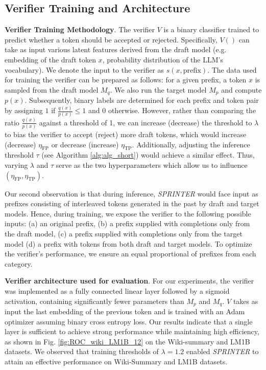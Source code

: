 \documentclass{article}
\newcommand{\revision}[1]{{\color{black} #1}}
\theoremstyle{plain}
\theoremstyle{definition}
\theoremstyle{remark}
\begin{document}
\subsection{Verifier Training and Architecture}
\label{sec:learn_veri}
\textbf{Verifier Training Methodology}. The verifier $V$ is a binary classifier trained to predict whether a token should be accepted or rejected. Specifically, $V()$ can take as input various latent features derived from the draft model (e.g. embedding of the draft token $x$, probability distribution of the LLM's vocabulary). We denote the input to the verifier as $s(x,\text{prefix})$. The data used for training the verifier can be prepared as follows: for a given prefix, a token $x$ is sampled from the draft model $M_q$. We also run the target model $M_p$ and compute $p(x)$.  Subsequently, binary labels are determined for each prefix and token pair by assigning $1$ if $\frac{q(x)}{p(x)} \leq 1$ and $0$ otherwise. \revision{ However, rather than comparing the ratio $\frac{q(x)}{p(x)}$ against a threshold of 1, we can increase (decrease) the threshold to $\lambda$ to bias the verifier to accept (reject) more draft tokens, which would increase (decrease) $\eta_\text{FP}$ or decrease (increase) $\eta_\text{TP}$.} Additionally, adjusting the inference threshold $\tau$ (see Algorithm \ref{alg:alg_short}) would achieve a similar effect. Thus, varying $\lambda$ and $\tau$ serve as the two hyperparameters which allow us to influence $(\eta_\text{FP},\eta_\text{TP})$. 

Our second observation is that during inference, \textit{SPRINTER} would face input as prefixes consisting of interleaved tokens generated in the past by draft and target models. Hence, during training, we expose the verifier to the following possible inputs: (a) an original prefix, (b) a prefix supplied with completions only from the draft model, (c) a prefix supplied with completions only from the target model (d) a prefix  with tokens from both draft and target models. To optimize the verifier's performance, we ensure an equal proportional of prefixes from each category.

\textbf{Verifier architecture used for evaluation}. For our experiments, the verifier was implemented as a fully connected linear layer followed by a sigmoid activation, containing significantly fewer parameters than $M_p$ and $M_q$. $V$ takes as input the last embedding of the previous token and is trained with an Adam optimizer assuming binary cross entropy loss. Our results indicate that a single layer is sufficient to achieve strong performance while maintaining high efficiency, as shown in Fig. \ref{fig:ROC_wiki_LM1B_12} on the Wiki-summary and LM1B datasets.  We observed that training thresholds of $\lambda=1.2$ enabled \textit{SPRINTER} to attain an effective performance on Wiki-Summary and LM1B datasets.   
\end{document}
